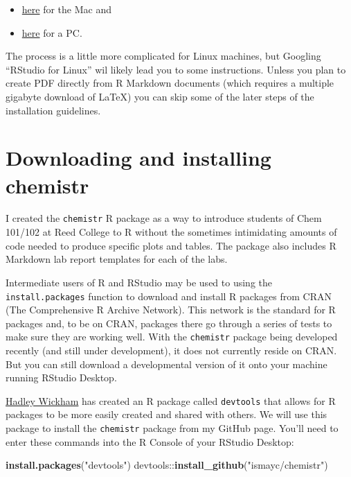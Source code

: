 \documentclass[]{tufte-book}
\newenvironment{Shaded}{\begin{snugshade}}{\end{snugshade}}
\newcommand{\KeywordTok}[1]{\textcolor[rgb]{0.13,0.29,0.53}{\textbf{{#1}}}}
\newcommand{\StringTok}[1]{\textcolor[rgb]{0.31,0.60,0.02}{{#1}}}
\newcommand{\NormalTok}[1]{{#1}}
\providecommand{\tightlist}{%
  \setlength{\itemsep}{0pt}\setlength{\parskip}{0pt}}
\begin{document}
\begin{itemize}
\tightlist
\item
  \href{http://www.reed.edu/data-at-reed/software/R/r_studio.html}{here}
  for the Mac and
\item
  \href{http://www.reed.edu/data-at-reed/software/R/r_studio_pc.html}{here}
  for a PC.
\end{itemize}

The process is a little more complicated for Linux machines, but
Googling ``RStudio for Linux'' wil likely lead you to some instructions.
Unless you plan to create PDF directly from R Markdown documents (which
requires a multiple gigabyte download of LaTeX) you can skip some of the
later steps of the installation guidelines.

\section{Downloading and installing
chemistr}\label{downloading-and-installing-chemistr}

I created the \texttt{chemistr} R package as a way to introduce students
of Chem 101/102 at Reed College to R without the sometimes intimidating
amounts of code needed to produce specific plots and tables. The package
also includes R Markdown lab report templates for each of the labs.

Intermediate users of R and RStudio may be used to using the
\texttt{install.packages} function to download and install R packages
from CRAN (The Comprehensive R Archive Network). This network is the
standard for R packages and, to be on CRAN, packages there go through a
series of tests to make sure they are working well. With the
\texttt{chemistr} package being developed recently (and still under
development), it does not currently reside on CRAN. But you can still
download a developmental version of it onto your machine running RStudio
Desktop.

\href{http://hadley.nz/}{Hadley Wickham} has created an R package called
\texttt{devtools} that allows for R packages to be more easily created
and shared with others. We will use this package to install the
\texttt{chemistr} package from my GitHub page. You'll need to enter
these commands into the R Console of your RStudio Desktop:

\begin{Shaded}
\begin{Highlighting}[]
\KeywordTok{install.packages}\NormalTok{(}\StringTok{"devtools"}\NormalTok{)}
\NormalTok{devtools::}\KeywordTok{install_github}\NormalTok{(}\StringTok{"ismayc/chemistr"}\NormalTok{)}
\end{Highlighting}
\end{Shaded}
\end{document}
